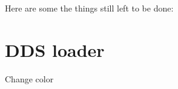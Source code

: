 Here are some the things still left to be done:\hypertarget{todo_loaderdds}{}\section{DDS loader}\label{todo_loaderdds}

\begin{DoxyItemize}
\item Change color 
\end{DoxyItemize}
